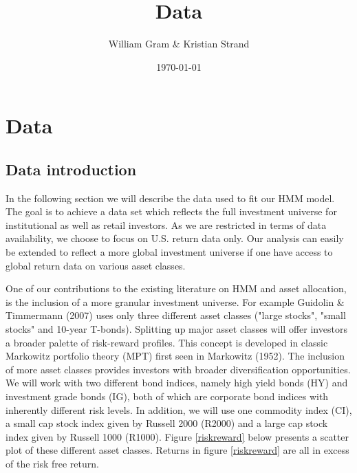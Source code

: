 \documentclass[11pt,a4paper,oneside]{article}
\title{Data}
\author{William Gram \& Kristian Strand}
\date{\today}
\begin{document}
\maketitle

\newpage

\rfoot{\thepage}

\tableofcontents

\newpage

\setcounter{page}{1}

\section{Data}\label{datasection}
\subsection{Data introduction}
\noindent In the following section we will describe the data used to fit our HMM model. The goal is to achieve a data set which reflects the full investment universe for institutional as well as retail investors. As we are restricted in terms of data availability, we choose to focus on U.S. return data only. Our analysis can easily be extended to reflect a more global investment universe if one have access to global return data on various asset classes.   

One of our contributions to the existing literature on HMM and asset allocation, is the inclusion of a more granular investment universe. For example Guidolin \& Timmermann (2007) \cite{2007} uses only three different asset classes ("large stocks", "small stocks" and 10-year T-bonds). Splitting up major asset classes will offer investors a broader palette of risk-reward profiles. This concept is developed in classic Markowitz portfolio theory (MPT) first seen in Markowitz (1952)\cite{MPT52}. The inclusion of more asset classes provides investors with broader diversification opportunities. We will work with two different bond indices, namely high yield bonds (HY) and investment grade bonds (IG), both of which are corporate bond indices with inherently different risk levels. In addition, we will use one commodity index (CI), a small cap stock index given by Russell 2000 (R2000) and a large cap stock index given by Russell 1000 (R1000). Figure \ref{riskreward} below presents a scatter plot of these different asset classes. Returns in figure \ref{riskreward} are all in excess of the risk free return.  
\end{document}
